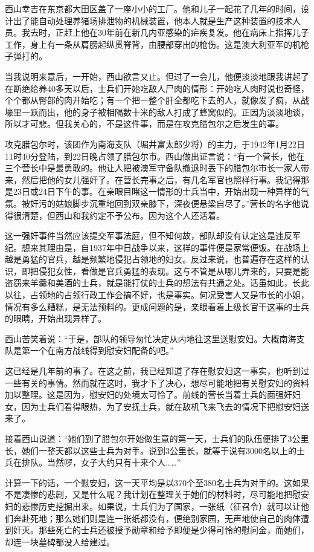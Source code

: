 \documentclass[12pt,UTF8]{ctexbook}
\begin{document}
西山幸吉在东京都大田区盖了一座小小的工厂。他和儿子一起花了几年的时间，设计出了能自动处理养猪场排泄物的机械装置，他本人就是生产这种装置的技术人员。我去时，正赶上他在30年前在新几内亚感染的疟疾复发。他在病床上指挥儿子工作，身上有一条从肩膀起纵贯脊背，由腰部穿出的枪伤。这是澳大利亚军的机枪子弹打的。

当我说明来意后，一开始，西山欲言又止。但过了一会儿，他便淡淡地跟我讲起了在断绝给养40多天以后，士兵们开始吃敌人尸肉的情形：开始吃人肉时说也奇怪，个个都从臀部的肉开始吃；有一个把一整个肝全都吃下去的人，就像发了疯，从战壕里一跃而出，他的身子被相隔数十米的敌人打成了蜂窝似的。正因为淡淡地谈，所以才可悲。但我关心的，不是这件事，而是在攻克腊包尔之后发生的事。

攻克腊包尔时，该团作为南海支队（堀井富太郎少将）的主力，于1942年1月22日11时40分登陆，到22日晚占领了腊包尔市。西山做出证言说：“有一个营长，他在三个营长中是最勇敢的。他让人把被澳军守备队撤退时丢下的腊包尔市长一家人带来，然后把他的女儿强奸了。在营长完事之后，有几名军官也照样行事。我记得那是23日或24日下午的事。在亲眼目睹这一情形的士兵当中，开始出现一种异样的气氛。被奸污的姑娘脚步沉重地回到双亲膝下，深夜便悬梁自尽了。”营长的名字他说得很清楚，但西山和我约定不予公布。因为这个人还活着。

这一强奸事件当然应该提交军事法庭，但不知何故，部队却没有认定这是违反军纪。想来其理由是，自1937年中日战争以来，这样的事件便是家常便饭。在战场上越是勇猛的官兵，越是频繁地侵犯占领地的妇女。反过来说，也普遍存在这样的认识，即把侵犯女性，看做是官兵勇猛的表现。这与不管是从哪儿弄来的，只要是能盗窃来羊羹和美酒的士兵，就是能打仗的士兵的想法有共通之处。话虽如此，长此以往，占领地的占领行政工作会搞不好，也是事实。何况受害人又是市长的小姐，情况有多么糟糕，是无法预料的。更成问题的是，亲眼看着上级长官干这事的士兵的眼睛，开始出现异样了。

西山苦笑着说：“于是，部队的领导匆忙决定从内地往这里送慰安妇。大概南海支队是第一个在南方战线得到慰安妇配备的吧。”

这已经是几年前的事了。在这之前，我已经知道了存在慰安妇这一事实，也听到过一些有关的事情。然而就在这时，我才下了决心，想尽可能地把有关慰安妇的资料加以整理。这是因为，慰安妇的处境太可怜了。前线的营长当着士兵的面强奸妇女，因为士兵们看得眼热，为了安抚士兵，就在敌机飞来飞去的情况下把慰安妇送来了。

接着西山说道：“她们到了腊包尔开始做生意的第一天，士兵们的队伍便排了3公里长，她们一整天都以这些士兵为对手。说到3公里长，就等于说有3000名以上的士兵在排队。当然啰，女子大约只有十来个人……”

计算一下的话，一个慰安妇，这一天平均是以370个至380名士兵为对手的。这如果不是凄惨的悲剧，又是什么呢？我计划在整理关于她们的材料时，尽可能地把慰安妇的悲惨历史挖掘出来。如果说，士兵们为了国家，一张纸（征召令）就可以让他们奔赴死地；那么她们则是连一张纸都没有，便绝别家园，无声地使自己的肉体遭到奸灭。那些死亡的士兵还被授予勋章和给予即便是少得可怜的慰问金，而她们，却连一块墓碑都没人给建过。
\end{document}

